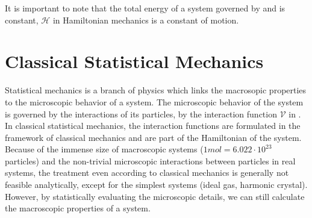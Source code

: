 It is important to note that the total energy of a system governed
by  and  is constant, \ie{} $\mathcal{H}$ in
Hamiltonian mechanics is a constant of motion.
%

\section{Classical Statistical Mechanics}

Statistical mechanics\cite{FR85.2,KU90.4,MC00.1,NA06.1,HU10.10} is a branch of physics
which links 
the macrosopic properties to the 
microscopic behavior of a system.
%
The microscopic behavior of the system
is governed by the interactions of its particles, \ie{} by the interaction function $\mathcal{V}$ in .
In classical statistical mechanics, the interaction functions are formulated in the framework of
classical mechanics and are part of the Hamiltonian of the system. Because of the immense size
of macroscopic systems ($1\unit{mol}=6.022\cdot 10^{23}$ particles) and the non-trivial microscopic
interactions between particles in real systems, the treatment even according to classical
mechanics 
is generally not feasible analytically, 
except for the simplest systems (ideal gas, harmonic crystal).
%
However, by statistically evaluating the microscopic details, 
we can still calculate the macroscopic properties of a system.
%

